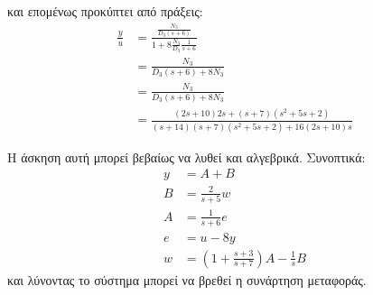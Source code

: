 \documentclass[11pt,a4paper,notitlepage,fleqn,final]{article}
\begin{document}
\begin{exercise}[2.19]
και επομένως προκύπτει από πράξεις:
\begin{align*}
	\frac{y}{u} &=
	\frac{\frac{N_3}{D_3(s+6)}}{1+8\frac{N_3}{D_3}\frac{1}{s+6}}
	\\ &= \frac{N_3}{D_3(s+6)+8N_3}
	\\ &= \frac{N_3}{D_3(s+6)+8N_3}
	\\ &= \frac{
		(2s+10)2s+(s+7)(s^2+5s+2)
		}{
		(s+14)(s+7)(s^2+5s+2)+16(2s+10)s
		}
\end{align*}

Η άσκηση αυτή μπορεί βεβαίως να λυθεί και αλγεβρικά. Συνοπτικά:
\begin{align}
	y &= A + B \label{ex.2.19.1} \\
	B &= \frac{2}{s+5}w \label{ex.2.19.2} \\
	A &= \frac{1}{s+6}e \label{ex.2.19.3} \\
	e &= u-8y \label{3x.2.19.4} \\
	w &= \left(1+\frac{s+3}{s+7}\right)A - \frac{1}{s}B \label{ex.2.19.5}
\end{align}
και λύνοντας το σύστημα μπορεί να βρεθεί η συνάρτηση μεταφοράς.

\end{exercise}
\end{document}
